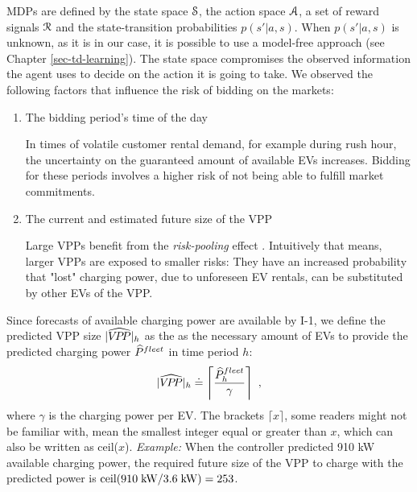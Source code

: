 \documentclass[a4paper, 12pt]{article}
\let\cite\shortcite
\begin{document}
MDPs are defined by the state space \(\S\), the action space \(\A\), a set of reward
signals \(\R\) and the state-transition probabilities \(p(s'|a,s)\). When
\(p(s'|a,s)\) is unknown, as it is in our case, it is possible to use a model-free
approach (see Chapter \ref{sec-td-learning}). The state space compromises the
observed information the agent uses to decide on the action it is going to take.
We observed the following factors that influence the risk of bidding on the
markets:
\begin{enumerate}
\item The bidding period's time of the day

In times of volatile customer rental demand, for example during rush hour,
the uncertainty on the guaranteed amount of available EVs increases. Bidding
for these periods involves a higher risk of not being able to fulfill market
commitments.
\item The current and estimated future size of the VPP

Large VPPs benefit from the \emph{risk-pooling} effect \cite{kahlen17_fleet}.
Intuitively that means, larger VPPs are exposed to smaller risks: They have
an increased probability that "lost" charging power, due to unforeseen EV
rentals, can be substituted by other EVs of the VPP.
\end{enumerate}
Since forecasts of available charging power are available by I-1, we define the
predicted VPP size \(\vpphat{h}\) as the as the necessary amount of EVs to provide
the predicted charging power \(\fPhat{}\) in time period \(h\):
\begin{equation}
    \vpphat{h} \defeq \left\lceil\frac{\fPhat{h}}{\gamma}\right\rceil \text{ ,}
\end{equation}
where \(\gamma\) is the charging power per EV. The brackets \(\lceil x \rceil\),
some readers might not be familiar with, mean the smallest integer equal or
greater than \(x\), which can also be written as ceil(\(x\)). \emph{Example:} When the
controller predicted 910 kW available charging power, the required future size
of the VPP to charge with the predicted power is \(\text{ceil}(910\;\kw/3.6\;\kw)
= 253\).
\end{document}

